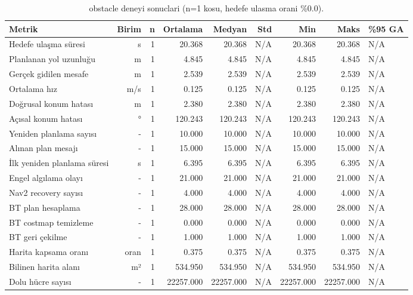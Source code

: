 \begin{table}[htbp]
\centering
\caption{obstacle deneyi sonuclari (n=1 kosu, hedefe ulasma orani \%0.0).}
\label{tab:benchmark-obstacle}
\begin{tabular}{lrrrrrrrl}
\toprule
Metrik & Birim & n & Ortalama & Medyan & Std & Min & Maks & \%95 GA \\
\midrule
Hedefe ulaşma süresi & s & 1 & 20.368 & 20.368 & N/A & 20.368 & 20.368 & N/A \\
Planlanan yol uzunluğu & m & 1 & 4.845 & 4.845 & N/A & 4.845 & 4.845 & N/A \\
Gerçek gidilen mesafe & m & 1 & 2.539 & 2.539 & N/A & 2.539 & 2.539 & N/A \\
Ortalama hız & m/s & 1 & 0.125 & 0.125 & N/A & 0.125 & 0.125 & N/A \\
Doğrusal konum hatası & m & 1 & 2.380 & 2.380 & N/A & 2.380 & 2.380 & N/A \\
Açısal konum hatası & ° & 1 & 120.243 & 120.243 & N/A & 120.243 & 120.243 & N/A \\
Yeniden planlama sayısı & - & 1 & 10.000 & 10.000 & N/A & 10.000 & 10.000 & N/A \\
Alınan plan mesajı & - & 1 & 15.000 & 15.000 & N/A & 15.000 & 15.000 & N/A \\
İlk yeniden planlama süresi & s & 1 & 6.395 & 6.395 & N/A & 6.395 & 6.395 & N/A \\
Engel algılama olayı & - & 1 & 21.000 & 21.000 & N/A & 21.000 & 21.000 & N/A \\
Nav2 recovery sayısı & - & 1 & 4.000 & 4.000 & N/A & 4.000 & 4.000 & N/A \\
BT plan hesaplama & - & 1 & 28.000 & 28.000 & N/A & 28.000 & 28.000 & N/A \\
BT costmap temizleme & - & 1 & 0.000 & 0.000 & N/A & 0.000 & 0.000 & N/A \\
BT geri çekilme & - & 1 & 1.000 & 1.000 & N/A & 1.000 & 1.000 & N/A \\
Harita kapsama oranı & oran & 1 & 0.375 & 0.375 & N/A & 0.375 & 0.375 & N/A \\
Bilinen harita alanı & m² & 1 & 534.950 & 534.950 & N/A & 534.950 & 534.950 & N/A \\
Dolu hücre sayısı & - & 1 & 22257.000 & 22257.000 & N/A & 22257.000 & 22257.000 & N/A \\
\bottomrule
\end{tabular}
\end{table}

